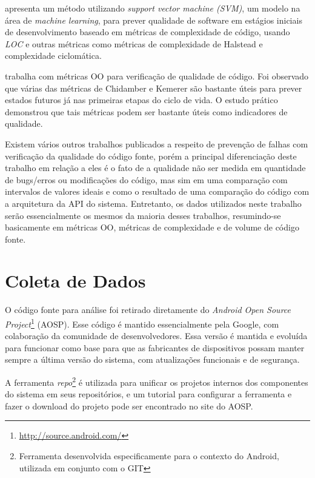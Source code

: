  apresenta um método utilizando \textit{support vector machine (SVM)}, um modelo na área de \textit{machine learning}, para prever qualidade de software em estágios iniciais de desenvolvimento baseado em métricas de complexidade de código, usando \textit{LOC} e outras métricas como métricas de complexidade de Halstead e complexidade ciclomática.

 trabalha com métricas OO para verificação de qualidade de código. Foi observado que várias das métricas de Chidamber e Kemerer são bastante úteis para prever estados futuros já nas primeiras etapas do ciclo de vida. O estudo prático demonstrou que tais métricas podem ser bastante úteis como indicadores de qualidade.

Existem vários outros trabalhos publicados a respeito de prevenção de falhas com verificação da qualidade do código fonte, porém a principal diferenciação deste trabalho em relação a eles é o fato de a qualidade não ser medida em quantidade de bugs/erros ou modificações do código, mas sim em uma comparação com intervalos de valores ideais e como o resultado de uma comparação do código com a arquitetura da API do sistema. Entretanto, os dados utilizados neste trabalho serão essencialmente os mesmos da maioria desses trabalhos, resumindo-se basicamente em métricas OO, métricas de complexidade e de volume de código fonte. 

\section{Coleta de Dados}

O código fonte para análise foi retirado diretamente do \textit{Android Open Source Project}\footnote{\url{http://source.android.com/}}  (AOSP). Esse código é mantido essencialmente pela Google, com colaboração da comunidade de desenvolvedores. Essa versão é mantida e evoluída para funcionar como base para que as fabricantes de dispositivos possam manter sempre a última versão do sistema, com atualizações funcionais e de segurança.

A ferramenta \textit{repo}\footnote{Ferramenta desenvolvida especificamente para o contexto do Android, utilizada em conjunto com o GIT}  é utilizada para unificar os projetos internos dos componentes do sistema em seus repositórios, e um tutorial para configurar a ferramenta e fazer o download do projeto pode ser encontrado no site do AOSP.

